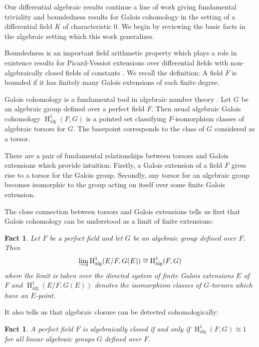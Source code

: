\documentclass{amsart}
\newtheorem{fact}[theorem]{Fact}
\theoremstyle{definition}
\theoremstyle{remark}
\numberwithin{equation}{section}
\def \HH {\operatorname{H}}
\def \alg {\operatorname{alg}}
\begin{document}
Our differential algebraic results continue a line of work \cite{pillay_1998_DGI} 
\cite{Pillay2004}
\cite{PILLAY2017809}  \cite{Minchenko_2019} 
\cite{Chatzidakis2017GeneralizedPE}
\cite{AnandDavidComm}  giving fundamental triviality and boundedness results for Galois cohomology in the setting of a differential field $K$ of characteristic $0$. We begin by reviewing the basic facts in the algebraic setting which this work generalizes. 

Boundedness is an important field arithmetic property which plays a role in existence results for Picard-Vessiot extensions over differential fields with non-algebraically closed fields of constants \cite{KamenskyPillay}. We recall the definition: A field $F$ is bounded if it has finitely many Galois extensions of each finite degree.

Galois cohomology is a fundamental tool in algebraic number theory \cite{Serre1979}. Let $G$ be an algebraic group defined over a perfect field $F$. Then usual algebraic Galois cohomology $\HH^1_{\alg}(F,G)$ is a pointed set classifying $F$-isomorphism classes of algebraic torsors for $G$. The basepoint corresponds to the class of $G$ considered as a torsor. 

There are a pair of fundamental relationships between torsors and Galois extensions which provide intuition: Firstly, a Galois extension of a field $F$ gives rise to a torsor for the Galois group. Secondly, any torsor for an algebraic group becomes isomorphic to the group acting on itself over some finite Galois extension. 

The close connection between torsors and Galois extensions tells us first that Galois cohomology can be understood as a limit of finite extensions:

\begin{fact}\relax\cite{Serre1979}
    Let $F$ be a perfect field and let $G$ be an algebraic group defined over $F$. Then $$\varinjlim \HH^1_{\alg}(E/F,G(E)) \cong \HH^1_{\alg}(F,G)$$ where the limit is taken over the directed system of finite Galois extensions $E$ of $F$ and $\HH^1_{\alg}(E/F,G(E))$ denotes the isomorphism classes of $G$-torsors which have an $E$-point. 
\end{fact} 

It also tells us that algebraic closure can be detected cohomologically:

\begin{fact}\cite{Serre1979}\relax
    A perfect field $F$ is algebraically closed if and only if $\HH^1_{\alg}(F,G) \cong 1$ for all linear algebraic groups $G$ defined over $F$. 
\end{fact}
\end{document}
